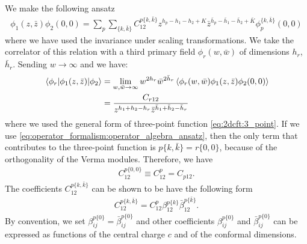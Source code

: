\documentclass[10pt]{article}
\begin{document}
We make the following ansatz
\begin{align}\label{eq:operator_formalism:operator_algebra_ansatz}
    \phi_1(z,\bar{z})\phi_2(0,0)=\sum_p \sum_{\{k,\bar{k}\}}C^{p\{k,\bar{k}\}}_{12}z^{h_p-h_1-h_2+K}\bar{z}^{\bar{h}_p-\bar{h}_1-\bar{h}_2+\bar{K}}\phi_p^{\{k,\bar{k}\}}(0,0)
\end{align}
where we have used the invariance under scaling transformations.
We take the correlator of this relation with a third primary field $\phi_r(w,\bar{w})$ of dimensions $h_r$, $\bar{h}_r$.
Sending $w\to\infty$ and we have:
\begin{align}
    \mel{\phi_r}{\phi_1(z,\bar{z})}{\phi_2}&=\lim_{w,\bar{w}\to\infty}w^{2h_r}\bar{w}^{2\bar{h}_r}\expval{\phi_r(w,\bar{w})\phi_1(z,\bar{z})\phi_2(0,0)}\notag\\
                                           &=\frac{C_{r12}}{z^{h_1+h_2-h_r}\bar{z}^{\bar{h}_1+\bar{h}_2-\bar{h}_r}}
\end{align}
where we used the general form of three-point function \cref{eq:2dcft:3_point}.
If we use \cref{eq:operator_formalism:operator_algebra_ansatz}, then the only term that contributes to the three-point function is $p\{k,\bar{k}\}=r\{0,0\}$, because of the orthogonality of the Verma modules.
Therefore, we have 
\begin{align}
    C^{p\{0,0\}}_{12}\equiv C^{p}_{12}=C_{p12}.
\end{align}
The coefficients $C^{p\{k,\bar{k}\}}_{12}$ can be shown to be have the following form\cite{Belavin:1984vu} 
\begin{align}
    C^{p\{k,\bar{k}\}}_{12}=C^p_{12}\beta^{p\{k\}}_{12}\bar{\beta}^{p\{\bar{k}\}}_{12}.
\end{align}
By convention, we set $\beta^{p\{0\}}_{ij}=\bar{\beta}^{p\{0\}}_{ij}$ and other coefficients $\beta^{p\{0\}}_{ij}$ and $\bar{\beta}^{p\{0\}}_{ij}$ can be expressed as functions of the central charge $c$ and of the conformal dimensions.
\end{document}
